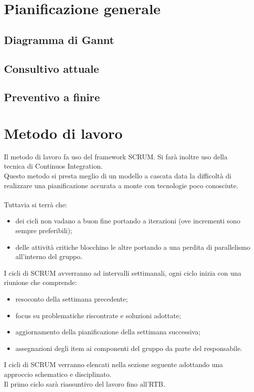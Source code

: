 \documentclass[a4paper, 12pt]{article}
\begin{document}
\makefrontpage

\makeversioni

\tableofcontents
\clearpage

\section{Pianificazione generale}
\subsection{Diagramma di Gannt}
\subsection{Consultivo attuale}
\subsection{Preventivo a finire}

\section{Metodo di lavoro}
Il metodo di lavoro fa uso del framework SCRUM. Si farà inoltre uso della tecnica di Continuos Integration.\\
Questo metodo si presta meglio di un modello a cascata data la difficoltà di realizzare una pianificazione accurata a monte con tecnologie poco conosciute.\\\\
Tuttavia si terrà che:
\begin{itemize} 
    \item dei cicli non vadano a buon fine portando a iterazioni (ove incrementi sono sempre preferibili);
    \item delle attività critiche blocchino le altre portando a una perdita di parallelismo all'interno del gruppo.
\end{itemize}
I cicli di SCRUM avverranno ad intervalli settimanali, ogni ciclo inizia con una riunione che comprende:
\begin{itemize}
    \item resoconto della settimana precedente;
    \item focus su problematiche riscontrate e soluzioni adottate;
    \item aggiornamento della pianificazione della settimana successiva;
    \item assegnazioni degli item ai componenti del gruppo da parte del responsabile.
\end{itemize}
I cicli di SCRUM verranno elencati nella sezione seguente adottando una approccio schematico e disciplinato.\\
Il primo ciclo sarà riassuntivo del lavoro fino all'RTB.
\end{document}
